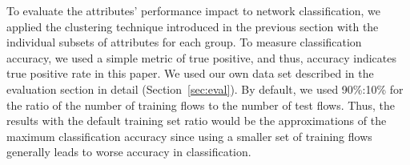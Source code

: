 \documentclass[conference]{IEEEtran}
\begin{document}

To evaluate the attributes' performance impact to network classification, we applied the clustering technique introduced in the previous section with the individual subsets of attributes for each group.
To measure classification accuracy, we used a simple metric of true positive, and thus, accuracy indicates true positive rate in this paper.
We used our own data set described in the evaluation section in detail (Section~\ref{sec:eval}).
By default, we used 90\%:10\% for the ratio of the number of training flows to the number of test flows.
Thus, the results with the default training set ratio would be the approximations of the maximum classification accuracy since using a smaller set of training flows generally leads to worse accuracy in classification.
\end{document}
